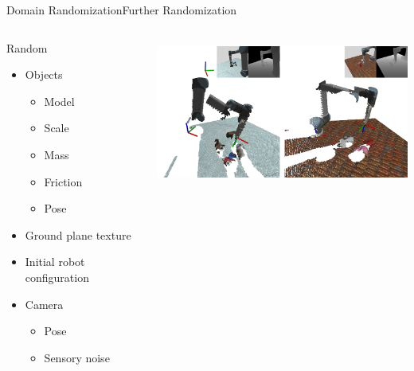 \begin{frame}{Domain Randomization}{Further Randomization}
    \begin{columns}%
        \begin{column}{0.35\textwidth}%
            \begin{block}{Random}
                \begin{itemize}
                    \item Objects
                          \begin{itemize}
                              \item Model
                              \item Scale
                              \item Mass
                              \item Friction
                              \item Pose
                          \end{itemize}
                    \item Ground plane texture
                    \item Initial robot configuration
                    \item Camera
                          \begin{itemize}
                              \item Pose
                              \item Sensory noise
                          \end{itemize}
                \end{itemize}
            \end{block}
        \end{column}
        \begin{column}{0.65\textwidth}%
            \centering
            \includegraphics[height=4.75cm]{graphics/random_camera_pose.png}
        \end{column}
    \end{columns}
\end{frame}


